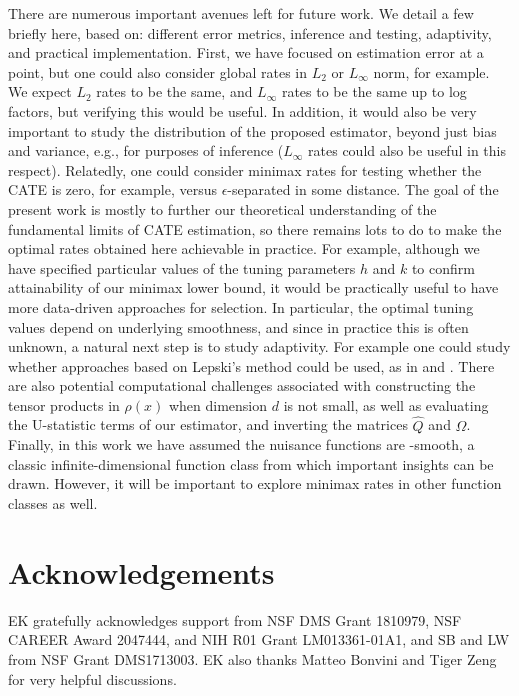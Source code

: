 \documentclass[11pt,twoside]{article}
\newcommand{\Holder}{\text{H\"{o}lder}}
\theoremstyle{definition}
\theoremstyle{remark}
\begin{document}
There are numerous important avenues left for future work. We detail a few briefly here, based on: different error metrics, inference and testing, adaptivity, and practical implementation. First, we have focused on estimation error at a point, but one could also consider global rates in $L_2$ or $L_\infty$ norm, for example. We expect $L_2$ rates to be the same, and $L_\infty$ rates to be the same up to log factors, but verifying this would be useful. In addition, it would also be very important to study the distribution of the proposed estimator, beyond just bias and variance, e.g., for purposes of inference ($L_\infty$ rates could also be useful in this respect). Relatedly, one could consider minimax rates for testing whether the CATE is zero, for example, versus $\epsilon$-separated in some distance.  The goal of the present work is mostly to further our theoretical understanding of the fundamental limits of CATE estimation, so there remains lots  to do to make the optimal rates obtained here achievable in practice. For example, although we have specified particular values of the tuning parameters $h$ and $k$ to confirm attainability of our minimax lower bound, it would be practically useful to have more data-driven approaches for selection. In particular, the optimal tuning values depend on underlying smoothness, and since in practice this is often unknown, a natural next step is to study adaptivity. For example one could study whether approaches based on Lepski's method could be used, as in \citet{mukherjee2015lepski} and \citet{liu2021adaptive}. There are also potential computational challenges associated with constructing the tensor products  in $\rho(x)$ when dimension $d$ is not small, as well as evaluating the U-statistic terms of our estimator, and inverting the matrices $\widehat{Q}$ and $\widehat\Omega$. Finally, in this work we have assumed the nuisance functions are \Holder{}-smooth, a classic infinite-dimensional function class from which important insights can be drawn.  However, it will be important to explore minimax rates in other function classes as well.  \\


\section*{Acknowledgements}

EK gratefully acknowledges support from NSF DMS Grant 1810979, NSF CAREER Award 2047444, and  NIH R01 Grant LM013361-01A1, and SB and LW from NSF Grant DMS1713003. EK also thanks Matteo Bonvini and Tiger Zeng for very helpful discussions. \\
\end{document}
